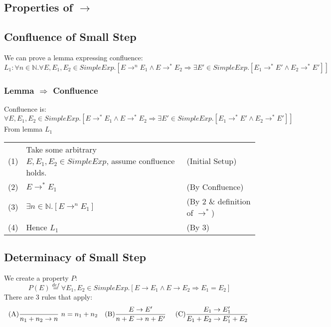 \documentclass{report}
\begin{document}
\subsection*{Properties of $\to$}
\begin{itemize}
\end{itemize}

\subsection*{Confluence of Small Step}
We can prove a lemma expressing confluence:
\[L_1 : \forall n \in \mathbb{N} . \forall E, E_1, E_2 \in SimpleExp . [E \to^n E_1 \land E \to^* E_2 \Rightarrow \exists E' \in SimpleExp . [E_1 \to^* E' \land E_2 \to^* E']]\]
\subsubsection*{Lemma $\Rightarrow$ Confluence}
Confluence is: $\forall E, E_1, E_2 \in SimpleExp . [E \to^* E_1 \land E \to^* E_2 \Rightarrow \exists E' \in SimpleExp . [E_1 \to^* E' \land E_2 \to^* E']]$
From lemma $L_1$
\begin{center}
	\begin{tabular}{l l l}
		(1) & Take some arbitrary $E, E_1, E_2 \in SimpleExp$, assume confluence holds. & (Initial Setup)                 \\
		(2) & $E \to^* E_1$                                                             & (By Confluence)                 \\
		(3) & $\exists n \in \mathbb{N} .[E \to^n E_1]$                                 & (By 2 \& definition of $\to^*$) \\
		(4) & Hence $L_1$                                                               & (By 3)                          \\
	\end{tabular}
\end{center}
\subsection*{Determinacy of Small Step}
We create a property $P$:
\[P(E) \overset{def}{=} \forall E_1,E_2 \in SimpleExp .[E \to E_1 \land E \to E_2 \Rightarrow E_1 = E_2] \]
There are 3 rules that apply:
\[\begin{matrix}
		\text{(A)}\dfrac{}{n_1 + n_2 \to n} \ n = n_1 + n_2 & \text{(B)}\dfrac{E \to E'}{n + E \to n + E'} \  & \text{(C)}\dfrac{E_1 \to E_1'}{E_1 + E_2 \to E_1' + E_2} \ 
	\end{matrix}\]
\end{document}
